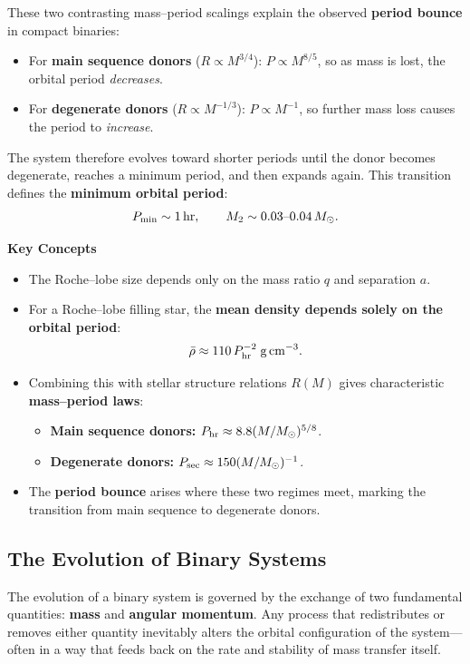 These two contrasting mass–period scalings explain the observed \textbf{period bounce} in compact binaries:
\begin{itemize}
    \item For \textbf{main sequence donors} ($R \propto M^{3/4}$):  
    $P \propto M^{8/5}$, so as mass is lost, the orbital period \emph{decreases}.
    \item For \textbf{degenerate donors} ($R \propto M^{-1/3}$):  
    $P \propto M^{-1}$, so further mass loss causes the period to \emph{increase}.
\end{itemize}
The system therefore evolves toward shorter periods until the donor becomes degenerate, reaches a minimum period, and then expands again.  
This transition defines the \textbf{minimum orbital period}:
\[
P_{\rm min} \sim 1\,{\rm hr}, 
\qquad
M_2 \sim 0.03\text{--}0.04\,M_\odot.
\]

\begin{bigidea}
\textbf{Key Concepts}
\begin{itemize}
    \item The Roche–lobe size depends only on the mass ratio $q$ and separation $a$.
    \item For a Roche–lobe filling star, the \textbf{mean density depends solely on the orbital period}:
    \[
    \bar{\rho} \approx 110\,P_{\rm hr}^{-2}\;{\rm g\,cm^{-3}}.
    \]
    \item Combining this with stellar structure relations $R(M)$ gives characteristic \textbf{mass–period laws}:
    \begin{itemize}
        \item \textbf{Main sequence donors:} $P_{\rm hr} \approx 8.8(M/M_\odot)^{5/8}$.
        \item \textbf{Degenerate donors:} $P_{\rm sec} \approx 150(M/M_\odot)^{-1}$.
    \end{itemize}
    \item The \textbf{period bounce} arises where these two regimes meet, marking the transition from main sequence to degenerate donors.
\end{itemize}
\end{bigidea}

\subsection{The Evolution of Binary Systems}

The evolution of a binary system is governed by the exchange of two fundamental quantities:
\textbf{mass} and \textbf{angular momentum}.  
Any process that redistributes or removes either quantity inevitably alters the orbital configuration of the system—often in a way that feeds back on the rate and stability of mass transfer itself.

